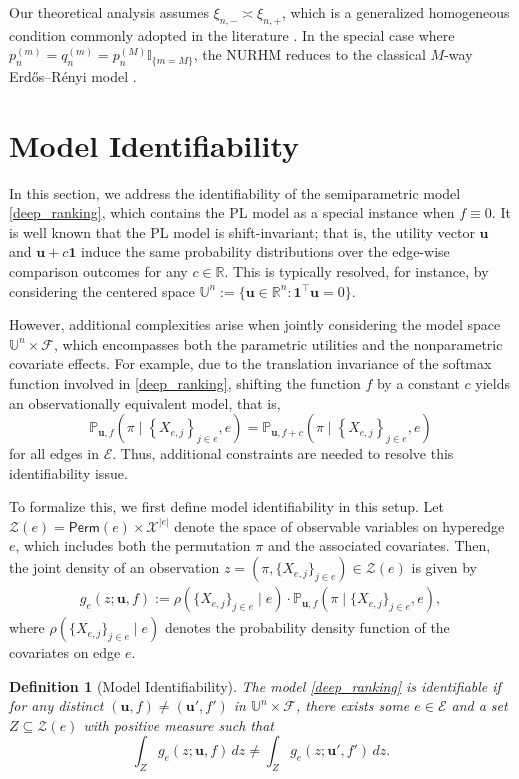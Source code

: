 \documentclass[
  12pt]{article}
\newtheorem{definition}{Definition}
\begin{document}
\noindent Our theoretical analysis assumes $\xi_{n,-} \asymp \xi_{n,+}$, which is a generalized homogeneous condition commonly adopted in the literature \citep{chen2019spectral,han2020aoap,lee2025pairwisetransitivity}. In the special case where $p_n^{(m)}=q_n^{(m)}=p_n^{(M)} \mathbb{I}_{\{m=M\}}$, the NURHM reduces to the classical $M$-way Erdős--R\'enyi model \citep{erdos1960evolution}.

\section{Model Identifiability}
\label{section:identifiability}

In this section, we address the identifiability of the semiparametric model \eqref{deep_ranking}, which contains the PL model as a special instance when $f\equiv 0$. It is well known that the PL model is shift-invariant; that is, the utility vector $\bm{u}$ and $\bm{u} + c\mathbf{1}$ induce the same probability distributions over the edge-wise comparison outcomes for any $c \in \mathbb{R}$. This is typically resolved, for instance, by considering the centered space $\mathbb{U}^n:= \{ \boldsymbol{u} \in \mathbb{R}^n: \mathbf{1}^{\top} \boldsymbol{u} = 0\}$.

However, additional complexities arise when jointly considering the model space  $\mathbb{U}^n \times \mathcal{F}$, which encompasses both the parametric utilities and the nonparametric covariate effects. For example, due to the translation invariance of the softmax function involved in \eqref{deep_ranking}, shifting the function $f$ by a constant $c$ yields an observationally equivalent model, that is,
$$\mathbb{P}_{\boldsymbol{u}, f}\left(\pi \mid \left\{X_{e, j}\right\}_{j \in e},e\right) = \mathbb{P}_{\boldsymbol{u}, f+c}\left(\pi \mid \left\{X_{e, j}\right\}_{j \in e},e\right)$$
\noindent for all edges in $\mathcal{E}$. Thus, additional constraints are needed to resolve this identifiability issue.


To formalize this, we first define model identifiability in this setup. Let \(\mathcal{Z}(e) = \mathsf{Perm}(e) \times \mathcal{X}^{|e|}\) denote the space of observable variables on hyperedge $e$, which includes both the permutation $\pi$ and the associated covariates. Then, the joint density of an observation $z = (\pi, \{X_{e, j}\}_{j\in e}) \in \mathcal{Z}(e)$ is given by
\begin{align*}
g_e(z; \boldsymbol{u}, f) := \rho(\{X_{e, j}\}_{j\in e} \mid e) \cdot \mathbb{P}_{\boldsymbol{u}, f}(\pi \mid \{X_{e, j}\}_{j\in e},e),
\end{align*}
where $\rho(\{X_{e, j}\}_{j\in e} \mid e)$ denotes the probability density function of the covariates on edge $e$. 
\begin{definition}[Model Identifiability]\label{def:identifiability}
   The model \eqref{deep_ranking} is \textit{identifiable} if for any distinct $(\boldsymbol{u}, f) \neq (\boldsymbol{u}', f')$ in $\mathbb{U}^n \times \mathcal{F}$, there exists some $e \in \mathcal{E}$ and a set $Z \subseteq \mathcal{Z}(e)$ with positive measure such that
$$
\int_Z g_e(z; \boldsymbol{u}, f) \, dz \neq \int_Z g_e(z; \boldsymbol{u}', f') \, dz.
$$
\end{definition}
\end{document}
